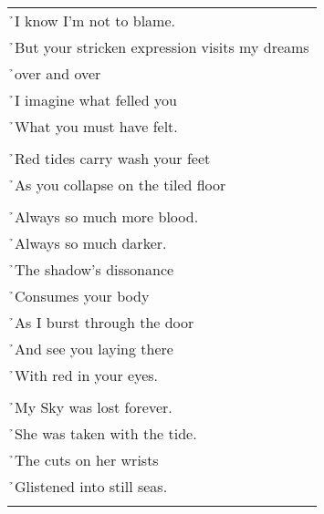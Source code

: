 \documentclass{article}
\begin{document}
\begin{center}
\begin{tabular}{l}
\h{}I know I'm not to blame. \\
\h{}But your stricken expression visits my dreams \\
\h{}over and over \\
\h{}I imagine what felled you \\
\h{}What you must have felt. \\
\\
\h{}Red tides carry wash your feet \\
\h{}As you collapse on the tiled floor \\
\\
\h{}Always so much more blood. \\
\h{}Always so much darker. \\
\h{}The shadow's dissonance \\
\h{}Consumes your body \\
\h{}As I burst through the door \\
\h{}And see you laying there \\
\h{}With red in your eyes. \\
\\
\h{}My Sky was lost forever. \\
\h{}She was taken with the tide. \\
\h{}The cuts on her wrists \\
\h{}Glistened into still seas. \\
\\
\end{tabular}
\end{center}
\end{document}
